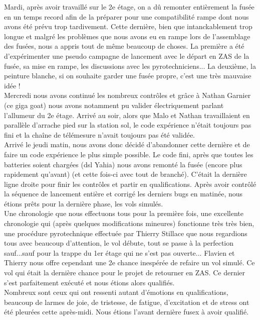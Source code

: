 \documentclass{article}
\begin{document}
Mardi, après avoir travaillé sur le 2e étage, on a dû remonter entièrement la fusée en un temps record afin de la préparer
pour une compatibilité rampe dont nous avons été prévu trop tardivement. Cette dernière, bien que intanckablement trop
longue et malgré les problèmes que nous avons eu en rampe lors de l'assemblage des fusées, nous a appris tout de même
beaucoup de choses. La première a été d'expérimenter une pseudo campagne de lancement avec le départ en ZAS de la fusée, sa
mise en rampe, les discussions avec les pyrotechniciens... La deuxième, la peinture blanche, si on souhaite garder une fusée
propre, c'est une très mauvaise idée !\\

Mercredi nous avons continué les nombreux contrôles et grâce à Nathan Garnier (ce giga goat) nous avons notamment pu valider
électriquement parlant l'allumeur du 2e étage. Arrivé au soir, alors que Malo et Nathan travaillaient en parallèle d'arrache
pied sur la station sol, le code expérience n'était toujours pas fini et la chaîne de télémesure n'avait toujours pas été
validée.\\

Arrivé le jeudi matin, nous avons donc décidé d'abandonner cette dernière et de faire un code expérience le plus simple
possible. Le code fini, après que toutes les batteries soient chargées (dsl Yahia) nous avons remonté la fusée (encore plus
rapidement qu'avant) (et cette fois-ci avec tout de branché). C'était la dernière ligne droite pour finir les contrôles et
partir en qualifications. Après avoir contrôlé la séquence de lancement entière et corrigé les derniers bugs en matinée, nous
étions prêts pour la dernière phase, les vols simulés.\\

Une chronologie que nous effectuons tous pour la première fois, une excellente chronologie qui (après quelques modifications
mineures) fonctionne très très bien, une procédure pyrotechnique effectuée par Thierry Stillace que nous regardions tous avec
beaucoup d'attention, le vol débute, tout se passe à la perfection sauf...sauf pour la trappe du 1er étage qui ne s'est pas
ouverte... Flavien et Thierry nous offre cependant une 2e chance inespérée de refaire un vol simulé. Ce vol qui était la
dernière chance pour le projet de retourner en ZAS. Ce dernier s'est parfaitement exécuté et nous étions alors qualifiés.\\

Nombreux sont ceux qui ont ressenti autant d'émotions en qualifications, beaucoup de larmes de joie, de tristesse, de
fatigue, d'excitation et de stress ont été pleurées cette après-midi. Nous étions l'avant dernière fusex à avoir qualifié.\\
\end{document}
